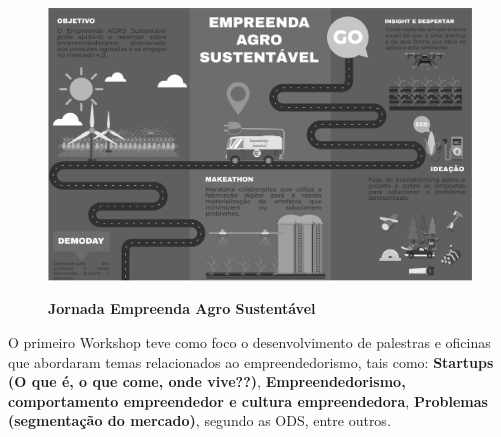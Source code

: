 \begin{figure}[!htb]
\centering
\caption{\textbf{Jornada Empreenda Agro Sustentável}}
\includegraphics[scale=0.4]{Imagens/jornada.png}
\label{figura_17}
\end{figure}

O primeiro Workshop teve como foco o desenvolvimento de palestras e oficinas que abordaram temas relacionados ao empreendedorismo, tais como: \textbf{Startups (O que é, o que come, onde vive??)}, \textbf{Empreendedorismo, comportamento empreendedor e cultura empreendedora},  \textbf{Problemas (segmentação do mercado)}, segundo as ODS, entre outros.  



